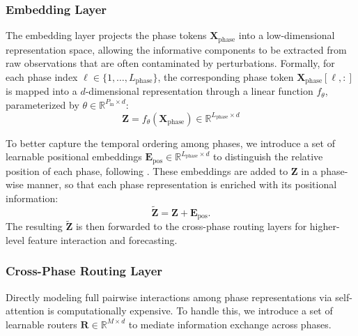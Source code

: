 \subsubsection{Embedding Layer}
\label{subsubsec:phase-embedding}
The embedding layer projects the phase tokens $\mathbf{X}_{\text{phase}}$ into a low-dimensional representation space, allowing the informative components to be extracted from raw observations that are often contaminated by perturbations. 
Formally, for each phase index $\ell \in \{1,\dots,L_{\text{phase}}\}$, the corresponding phase token $\mathbf{X}_{\text{phase}}[\ell, :]$ is mapped into a $d$-dimensional representation through a linear function $f_{\theta}$, parameterized by $\theta \in \mathbb{R}^{P_{\text{in}}\times d}$:
\begin{equation}
\mathbf{Z} 
= f_{\theta}\!\left(\mathbf{X}_{\text{phase}}\right)\in \mathbb{R}^{L_{\text{phase}}\times d}
\label{eq:phase-embedding}
\end{equation}

To better capture the temporal ordering among phases, we introduce a set of learnable positional embeddings $\mathbf{E}_{\text{pos}}\in\mathbb{R}^{L_{\text{phase}}\times d}$ to distinguish the relative position of each phase, following \cite{liu2023spatio}. 
These embeddings are added to $\mathbf{Z}$ in a phase-wise manner, so that each phase representation is enriched with its positional information:
\begin{equation}
\tilde{\mathbf{Z}}=\mathbf{Z}+\mathbf{E}_{\text{pos}}.
\end{equation}
The resulting $\tilde{\mathbf{Z}}$ is then forwarded to the cross-phase routing layers for higher-level feature interaction and forecasting.

\subsubsection{Cross-Phase Routing Layer}

Directly modeling full pairwise interactions among phase representations via self-attention is computationally expensive. 
To handle this, we introduce a set of learnable routers $\mathbf{R}\in\mathbb{R}^{M\times d}$ to mediate information exchange across phases. 

